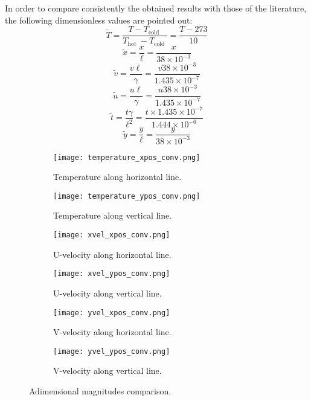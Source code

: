 In order to compare consistently the obtained results with those of the literature, the following dimensionless values are pointed out:
\begin{equation}
	\tilde{T}=\frac{T-T_{\text {cold }}}{T_{\text {hot }}-T_{\text {cold }}}=\frac{T-273}{10}
	\label{3.29}
\end{equation}
\begin{equation}
	\tilde{x}=\frac{x}{\ell}=\frac{x}{38 \times 10^{-3}}
	\label{3.30}
\end{equation}
\begin{equation}
	\tilde{v}=\frac{v \ell}{\gamma}=\frac{v 38 \times 10^{-3}}{1.435 \times 10^{-7}}
	\label{3.31}
\end{equation}
\begin{equation}
	\tilde{u}=\frac{u \ell}{\gamma}=\frac{u 38 \times 10^{-3}}{1.435 \times 10^{-7}}
	\label{3.32}
\end{equation}
\begin{equation}
	\tilde{t}=\frac{t \gamma}{\ell^{2}}=\frac{t \times 1.435 \times 10^{-7}}{1.444 \times 10^{-6}}
	\label{3.33}
\end{equation}
\begin{equation}
	\tilde{y}=\frac{y}{\ell}=\frac{y}{38 \times 10^{-3}}
	\label{3.34}
\end{equation}
\clearpage
\begin{figure}[h!]
	\begin{subfigure}{0.50\textwidth}
		\centering
		\texttt{[image: temperature\_xpos\_conv.png]}\hfill
		\caption{Temperature along horizontal line.} \label{3.6afig}
	\end{subfigure}
	\hfill
	\begin{subfigure}{0.50\textwidth}
		\centering
		\texttt{[image: temperature\_ypos\_conv.png]}	
		\caption{Temperature along vertical line.}\label{3.6bfig}
	\end{subfigure}
	\begin{subfigure}{0.50\textwidth}
		\texttt{[image: xvel\_xpos\_conv.png]}\hfill
		\caption{U-velocity along horizontal line.}\label{3.6cfig}
	\end{subfigure}
	\begin{subfigure}{0.50\textwidth}
	\texttt{[image: xvel\_ypos\_conv.png]}	
	\caption{U-velocity along vertical line.}\label{3.6dfig}
	\end{subfigure}
	\begin{subfigure}{0.50\textwidth}
	\texttt{[image: yvel\_xpos\_conv.png]}\hfill	
	\caption{V-velocity along horizontal line.}\label{3.6efig}
	\end{subfigure}
	\begin{subfigure}{0.50\textwidth}
	\texttt{[image: yvel\_ypos\_conv.png]}	
	\caption{V-velocity along vertical line.}\label{3.6ffig}
	\end{subfigure}
	\caption{Adimensional magnitudes comparison.}
	\label{3.6fig}
\end{figure} 
